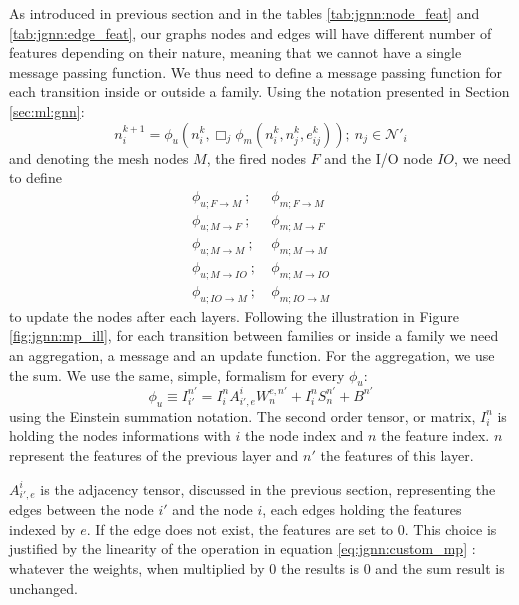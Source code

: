 \documentclass[../main.tex]{subfiles}
\begin{document}
As introduced in previous section and in the tables \ref{tab:jgnn:node_feat} and \ref{tab:jgnn:edge_feat}, our graphs nodes and edges will have different number of features depending on their nature, meaning that we cannot have a single message passing function. We thus need to define a message passing function for each transition inside or outside a family. Using the notation presented in Section \ref{sec:ml:gnn}:
\begin{equation}
  \label{eq:jgnn:gen_mp}
  n_i^{k+1} = \phi_u (n_i^k, \Box_j \phi_m(n_i^k, n_j^k, e^k_{ij})); ~ n_j \in \mathcal{N}'_i
\end{equation}
and denoting the mesh nodes $M$, the fired nodes $F$ and the I/O node $IO$, we need to define
\begin{align*}
  \phi_{u; F\rightarrow M}  ~;~ &\phi_{m; F\rightarrow M} \\
  \phi_{u; M\rightarrow F}  ~;~ &\phi_{m; M\rightarrow F} \\
  \phi_{u; M\rightarrow M}  ~;~ &\phi_{m; M\rightarrow M} \\
  \phi_{u; M\rightarrow IO} ~;~ &\phi_{m; M\rightarrow IO} \\
  \phi_{u; IO\rightarrow M} ~;~ &\phi_{m; IO\rightarrow M}
\end{align*}
to update the nodes after each layers. Following the illustration in Figure \ref{fig:jgnn:mp_ill}, for each transition between families or inside a family we need an aggregation, a message and an update function. For the aggregation, we use the sum. We use the same, simple, formalism for every $\phi_u$:
\begin{equation}
  \label{eq:jgnn:custom_mp}
  \phi_u \equiv I^{n'}_{i'} = I^n_i A_{i',e}^{i} W_n^{e,n'} + I^n_i S^{n'}_{n} + B^{n'}
\end{equation}
using the Einstein summation notation. The second order tensor, or matrix, $I^{n}_i$ is holding the nodes informations with $i$ the node index and $n$ the feature index. $n$ represent the features of the previous layer and $n'$ the features of this layer.

$A_{i',e}^{i}$ is the adjacency tensor, discussed in the previous section, representing the edges between the node $i'$ and the node $i$, each edges holding the features indexed by $e$. If the edge does not exist, the features are set to 0. This choice is justified by the linearity of the operation in equation \ref{eq:jgnn:custom_mp} : whatever the weights, when multiplied by 0 the results is 0 and the sum result is unchanged.
\end{document}
